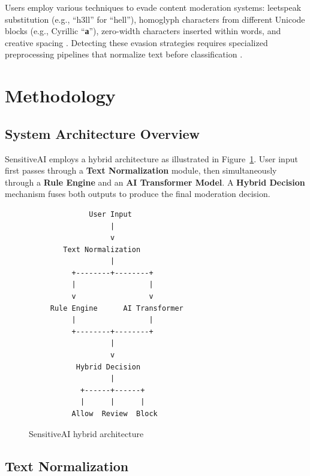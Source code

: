 \documentclass[12pt,a4paper]{article}
\begin{document}
Users employ various techniques to evade content moderation systems:
leetspeak substitution (e.g., ``h3ll'' for ``hell''),
homoglyph characters from different Unicode blocks (e.g., Cyrillic ``\textbf{а}''), zero-width characters inserted within words, and creative spacing \cite{tan2022sweet}.
Detecting these evasion strategies requires specialized preprocessing pipelines that normalize text before classification \cite{wulczyn2017ex}.

\section{Methodology}
\label{sec:methodology}

\subsection{System Architecture Overview}

SensitiveAI employs a hybrid architecture as illustrated in Figure~\ref{fig:architecture}.
User input first passes through a \textbf{Text Normalization} module, then simultaneously through a \textbf{Rule Engine} and an \textbf{AI Transformer Model}.
A \textbf{Hybrid Decision} mechanism fuses both outputs to produce the final moderation decision.

\begin{figure}[htbp]
    \centering
    \begin{verbatim}
              User Input
                   |
                   v
        Text Normalization
                   |
          +--------+--------+
          |                 |
          v                 v
     Rule Engine      AI Transformer
          |                 |
          +--------+--------+
                   |
                   v
           Hybrid Decision
                   |
            +------+------+
            |      |      |
          Allow  Review  Block
    \end{verbatim}
    \caption{SensitiveAI hybrid architecture}
    \label{fig:architecture}
\end{figure}

\subsection{Text Normalization}
\end{document}
